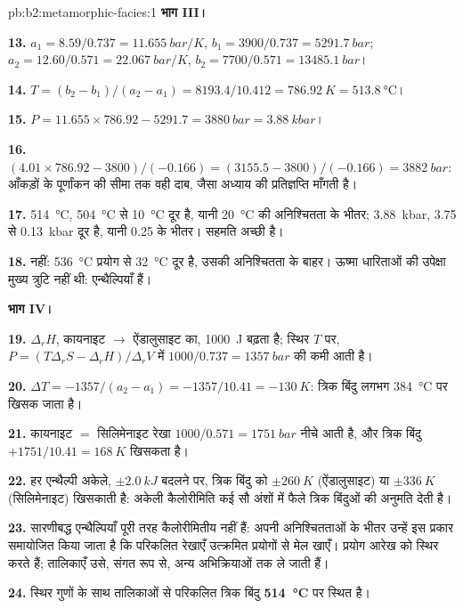 \begin{solution}{pb:b2:metamorphic-facies:1}
\noindent\textbf{भाग III।}

\textbf{13.} $a_1 = 8.59/0.737 = \qty{11.655}{bar/K}$, $b_1 = 3900/0.737 =
\qty{5291.7}{bar}$; $a_2 = 12.60/0.571 = \qty{22.067}{bar/K}$, $b_2 = 7700/0.571 =
\qty{13485.1}{bar}$।

\textbf{14.} $T = (b_2 - b_1)/(a_2 - a_1) = 8193.4/10.412 = \qty{786.92}{K} =
\qty{513.8}{\celsius}$।

\textbf{15.} $P = 11.655\times786.92 - 5291.7 = \qty{3880}{bar} = \qty{3.88}{kbar}$।

\textbf{16.} $(4.01\times786.92 - 3800)/(-0.166) = (3155.5 - 3800)/(-0.166) =
\qty{3882}{bar}$: आँकड़ों के पूर्णांकन की सीमा तक वही दाब, जैसा अध्याय की प्रतिज्ञप्ति माँगती है।

\textbf{17.} \qty{514}{\celsius}, \qty{504}{\celsius} से \qty{10}{\celsius} दूर है, यानी
\qty{20}{\celsius} की अनिश्चितता के भीतर; \qty{3.88}{kbar}, 3.75 से \qty{0.13}{kbar} दूर है,
यानी 0.25 के भीतर। सहमति अच्छी है।

\textbf{18.} नहीं: \qty{536}{\celsius} प्रयोग से \qty{32}{\celsius} दूर है, उसकी
अनिश्चितता के बाहर। ऊष्मा धारिताओं की उपेक्षा मुख्य त्रुटि नहीं थी: एन्थैल्पियाँ हैं।

\noindent\textbf{भाग IV।}

\textbf{19.} $\Delta_r H$, कायनाइट $\to$ ऐंडालुसाइट का, \qty{1000}{J} बढ़ता है; स्थिर
$T$ पर, $P = (T\Delta_r S - \Delta_r H)/\Delta_r V$ में $1000/0.737 = \qty{1357}{bar}$ की कमी आती है।

\textbf{20.} $\Delta T = -1357/(a_2 - a_1) = -1357/10.41 = \qty{-130}{K}$: त्रिक बिंदु
लगभग \qty{384}{\celsius} पर खिसक जाता है।

\textbf{21.} कायनाइट $=$ सिलिमेनाइट रेखा $1000/0.571 = \qty{1751}{bar}$ नीचे आती है, और
त्रिक बिंदु $+1751/10.41 = \qty{+168}{K}$ खिसकता है।

\textbf{22.} हर एन्थैल्पी अकेले, $\pm\qty{2.0}{kJ}$ बदलने पर, त्रिक बिंदु को
$\pm\qty{260}{K}$ (ऐंडालुसाइट) या $\pm\qty{336}{K}$ (सिलिमेनाइट) खिसकाती है: अकेली कैलोरीमिति
कई सौ अंशों में फैले त्रिक बिंदुओं की अनुमति देती है।

\textbf{23.} सारणीबद्ध एन्थैल्पियाँ पूरी तरह कैलोरीमितीय नहीं हैं: अपनी
अनिश्चितताओं के भीतर उन्हें इस प्रकार समायोजित किया जाता है कि परिकलित रेखाएँ उत्क्रमित प्रयोगों से मेल खाएँ।
प्रयोग आरेख को स्थिर करते हैं; तालिकाएँ उसे, संगत रूप से, अन्य अभिक्रियाओं तक ले जाती हैं।

\textbf{24.} स्थिर गुणों के साथ तालिकाओं से परिकलित त्रिक बिंदु
\textbf{\qty[text-series-to-math=true]{514}{\celsius}} पर स्थित है।
\end{solution}
